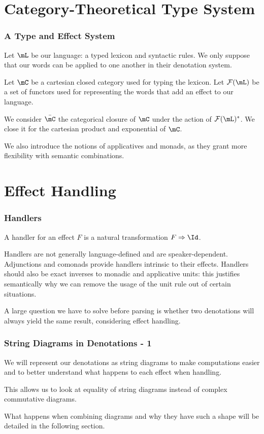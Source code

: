 \documentclass[math, english, info]{beamercours}
\begin{document}
\section{Category-Theoretical Type System}
\begin{frame}
	\frametitle{A Type and Effect System}
	Let $\mL$ be our language: a typed lexicon and syntactic rules.
	We only suppose that our words can be applied to one another in their
	denotation system.

	\pause

	Let $\mC$ be a cartesian closed category used for typing the lexicon.
	Let $\mathcal{F}(\mL)$ be a set of functors used for representing the words
	that add an effect to our language.

	\pause\smallskip

	We consider $\bar{\mC}$ the categorical closure of $\mC$ under the action
	of $\mathcal{F}(\mL)^{*}$.
	We close it for the cartesian product and exponential of $\mC$.

	\pause\smallskip

	We also introduce the notions of applicatives and monads, as they grant more
	flexibility with semantic combinations.
\end{frame}

\section{Effect Handling}
\begin{frame}
	\frametitle{Handlers}
	A handler for an effect $F$ is a natural transformation $F \Rightarrow \Id$.

	\smallskip

	Handlers are not generally language-defined and are speaker-dependent.
	Adjunctions and comonads provide handlers intrinsic to their effects.
	Handlers should also be exact inverses to monadic and applicative units:
	this justifies semantically why we can remove the usage of the unit rule out
	of certain situations.

	\smallskip

	A large question we have to solve before parsing is whether two denotations
	will always yield the same result, considering effect handling.
\end{frame}

\begin{frame}
	\frametitle{String Diagrams in Denotations - 1}
	We will represent our denotations as string diagrams to make computations
	easier and to better understand what happens to each effect when handling.

	\medskip

	This allows us to look at equality of string diagrams instead of complex
	commutative diagrams.

	\medskip

	What happens when combining diagrams and why they have such a shape will be
	detailed in the following section.
\end{frame}
\end{document}
